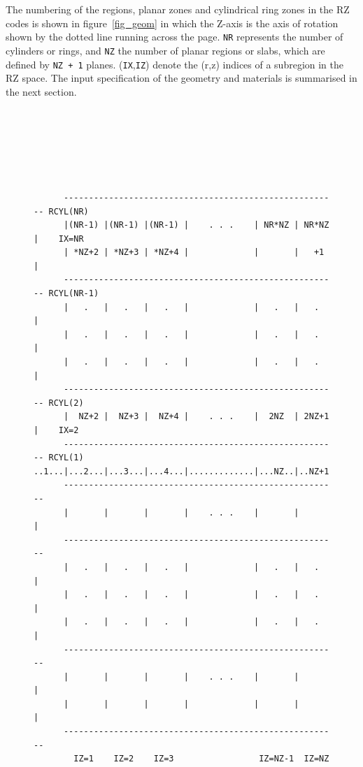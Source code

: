 \documentclass[12pt,twoside]{article}  %
\begin{document}
The numbering of the regions, planar zones and cylindrical
ring zones in the RZ codes is shown in figure~\ref{fig_geom} in which
the Z-axis is the axis of rotation shown by the dotted line running
across the page. \verb+NR+ represents the number of cylinders  or rings, and
\verb+NZ+ the number of planar regions or slabs,
which are defined by {\tt NZ + 1}
planes.
(\verb+IX+,\verb+IZ+) denote the (r,z) indices of a subregion in the
RZ space.
The input specification of the geometry and materials is summarised
in the next section.

\begin{figure}[htb]
    
\begin{center}

\begin{verbatim}






      ------------------------------------------------------- RCYL(NR)
      |(NR-1) |(NR-1) |(NR-1) |    . . .    | NR*NZ | NR*NZ |    IX=NR
      | *NZ+2 | *NZ+3 | *NZ+4 |             |       |   +1  |
      ------------------------------------------------------- RCYL(NR-1)
      |   .   |   .   |   .   |             |   .   |   .   |
      |   .   |   .   |   .   |             |   .   |   .   |
      |   .   |   .   |   .   |             |   .   |   .   |
      ------------------------------------------------------- RCYL(2)
      |  NZ+2 |  NZ+3 |  NZ+4 |    . . .    |  2NZ  | 2NZ+1 |    IX=2
      ------------------------------------------------------- RCYL(1)
..1...|...2...|...3...|...4...|.............|...NZ..|..NZ+1.|....IX=1..1..
      -------------------------------------------------------
      |       |       |       |    . . .    |       |       |
      -------------------------------------------------------
      |   .   |   .   |   .   |             |   .   |   .   |
      |   .   |   .   |   .   |             |   .   |   .   |
      |   .   |   .   |   .   |             |   .   |   .   |
      -------------------------------------------------------
      |       |       |       |    . . .    |       |       |
      |       |       |       |             |       |       |
      -------------------------------------------------------
        IZ=1    IZ=2    IZ=3                 IZ=NZ-1  IZ=NZ



\end{verbatim}
\end{center}
\end{figure}
\end{document}
